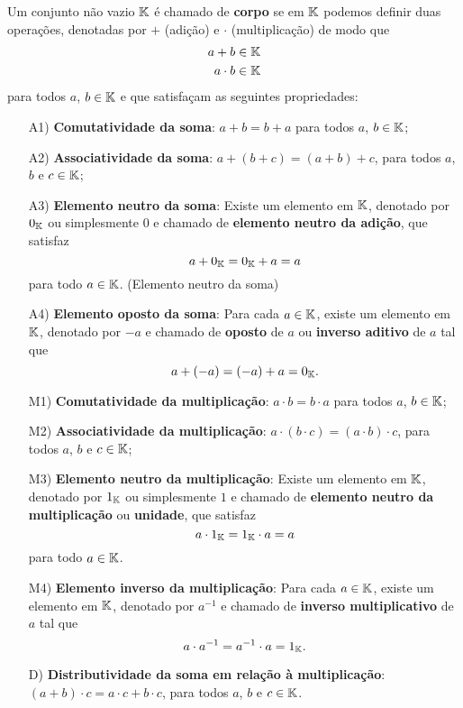 \begin{definicao}
	Um conjunto n\~ao vazio $\mathbb{K}$ \'e chamado de \textbf{corpo} se em $\mathbb{K}$ podemos definir duas opera\c{c}\~oes, denotadas por
	$+$ (adi\c{c}\~ao) e $\cdot$ (multiplica\c{c}\~ao) de modo que
	\begin{align*}
		a + b \in \mathbb{K}\\
		a \cdot b \in \mathbb{K}
	\end{align*}
	para todos $a$, $b \in \mathbb{K}$ e que satisfa\c{c}am as seguintes propriedades:
	\begin{itemize}

		\item[A1)] \textbf{Comutatividade da soma}: $a + b = b + a$ para todos $a$, $b \in \mathbb{K}$;
		\item[A2)] \textbf{Associatividade da soma}: $a + (b + c) = (a + b) + c$, para todos $a$, $b$ e $c \in \mathbb{K}$;
		\item[A3)] \textbf{Elemento neutro da soma}: Existe um elemento em $\mathbb{K}$, denotado por $0_{\mathbb{K}}$ ou simplesmente $0$ e chamado de \textbf{elemento neutro da adi\c{c}\~ao}, que satisfaz
		\[
		  a + 0_{\mathbb{K}} = 0_{\mathbb{K}} + a = a
		\]
		para todo $a \in \mathbb{K}$. (Elemento neutro da soma)
		\item[A4)] \textbf{Elemento oposto da soma}: Para cada $a \in \mathbb{K}$, existe um elemento em $\mathbb{K}$, denotado por $-a$ e chamado de \textbf{oposto} de $a$ ou \textbf{inverso aditivo} de $a$ tal que
		\[
		  a + (-a) = (-a) + a = 0_{\mathbb{K}}.
		\]
		\item[M1)] \textbf{Comutatividade da multiplica\c{c}\~ao}: $a \cdot b = b \cdot a$ para todos $a$, $b \in \mathbb{K}$;
		\item[M2)] \textbf{Associatividade da multiplica\c{c}\~ao}: $a \cdot (b \cdot c) = (a \cdot b) \cdot c$, para todos $a$, $b$ e $c \in \mathbb{K}$;
		\item[M3)] \textbf{Elemento neutro da multiplica\c{c}\~ao}: Existe um elemento em $\mathbb{K}$, denotado por $1_{\mathbb{K}}$ ou simplesmente $1$ e chamado de \textbf{elemento neutro da multiplica\c{c}\~ao} ou \textbf{unidade}, que satisfaz
		\[
		  a \cdot 1_{\mathbb{K}} = 1_{\mathbb{K}} \cdot a = a
		\]
		para todo $a \in \mathbb{K}$.
		\item[M4)] \textbf{Elemento inverso da multiplica\c{c}\~ao}: Para cada $a \in \mathbb{K}$, existe um elemento em $\mathbb{K}$, denotado por $a^{-1}$ e chamado de \textbf{inverso multiplicativo} de $a$ 
		tal que
		\[
		  a \cdot a^{-1} = a^{-1} \cdot a = 1_{\mathbb{K}}.
		\]
		\item[D)] \textbf{Distributividade da soma em rela\c{c}\~ao \`a multiplica\c{c}\~ao}: $(a + b)\cdot c = a\cdot c + b\cdot c$, para todos $a$, $b$ e $c \in \mathbb{K}$.
	\end{itemize}
\end{definicao}

